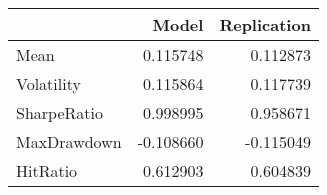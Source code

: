 \begin{tabular}{lrr}
\toprule
{} &     Model &  Replication \\
\midrule
Mean        &  0.115748 &     0.112873 \\
Volatility  &  0.115864 &     0.117739 \\
SharpeRatio &  0.998995 &     0.958671 \\
MaxDrawdown & -0.108660 &    -0.115049 \\
HitRatio    &  0.612903 &     0.604839 \\
\bottomrule
\end{tabular}
